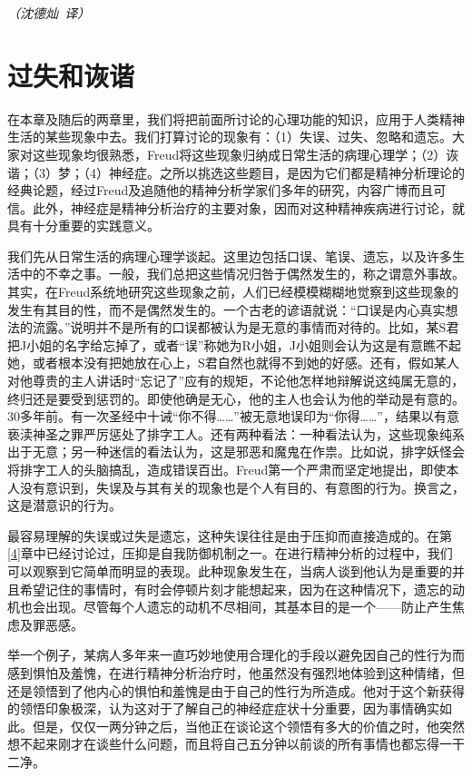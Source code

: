 \documentclass[UTF8,10pt,a4paper,openany]{book}
\newcommand{\signature}[1]{\begin{flushright}\slshape #1\end{flushright}}
\newcommand{\signatureB}{\signature{（沈德灿~译）}}
\begin{document}
\signatureB



\chapter{过失和诙谐}\label{6}

在本章及随后的两章里，我们将把前面所讨论的心理功能的知识，应用于人类精神生活的某些现象中去。我们打算讨论的现象有：（1）失误、过失、忽略和遗忘。大家对这些现象均很熟悉，Freud将这些现象归纳成日常生活的病理心理学；（2）诙谐；（3）梦；（4）神经症。之所以挑选这些题目，是因为它们都是精神分析理论的经典论题，经过Freud及追随他的精神分析学家们多年的研究，内容广博而且可信。此外，神经症是精神分析治疗的主要对象，因而对这种精神疾病进行讨论，就具有十分重要的实践意义。

我们先从日常生活的病理心理学谈起。这里边包括口误、笔误、遗忘，以及许多生活中的不幸之事。一般，我们总把这些情况归咎于偶然发生的，称之谓意外事故。其实，在Freud系统地研究这些现象之前，人们已经模模糊糊地觉察到这些现象的发生有其目的性，而不是偶然发生的。一个古老的谚语就说：“口误是内心真实想法的流露。”说明并不是所有的口误都被认为是无意的事情而对待的。比如，某S君把J小姐的名字给忘掉了，或者“误”称她为R小姐，J小姐则会认为这是有意瞧不起她，或者根本没有把她放在心上，S君自然也就得不到她的好感。还有，假如某人对他尊贵的主人讲话时“忘记了”应有的规矩，不论他怎样地辩解说这纯属无意的，终归还是要受到惩罚的。即使他确是无心，他的主人也会认为他的举动是有意的。30多年前。有一次圣经中十诫“你不得\ldots\ldots”被无意地误印为“你得\ldots\ldots”，结果以有意亵渎神圣之罪严厉惩处了排字工人。还有两种看法：一种看法认为，这些现象纯系出于无意；另一种迷信的看法认为，这是邪恶和魔鬼在作祟。比如说，排字妖怪会将排字工人的头脑搞乱，造成错误百出。Freud第一个严肃而坚定地提出，即使本人没有意识到，失误及与其有关的现象也是个人有目的、有意图的行为。换言之，这是潜意识的行为。

最容易理解的失误或过失是遗忘，这种失误往往是由于压抑而直接造成的。在第\ref{4}章中已经讨论过，压抑是自我防御机制之一。在进行精神分析的过程中，我们可以观察到它简单而明显的表现。此种现象发生在，当病人谈到他认为是重要的并且希望记住的事情时，有时会停顿片刻才能想起来，因为在这种情况下，遗忘的动机也会出现。尽管每个人遗忘的动机不尽相间，其基本目的是一个——防止产生焦虑及罪恶感。

举一个例子，某病人多年来一直巧妙地使用合理化的手段以避免因自己的性行为而感到惧怕及羞愧，在进行精神分析治疗时，他虽然没有强烈地体验到这种情绪，但还是领悟到了他内心的惧怕和羞愧是由于自己的性行为所造成。他对于这个新获得的领悟印象极深，认为这对于了解自己的神经症症状十分重要，因为事情确实如此。但是，仅仅一两分钟之后，当他正在谈论这个领悟有多大的价值之时，他突然想不起来刚才在谈些什么问题，而且将自己五分钟以前谈的所有事情也都忘得一干二净。
\end{document}
